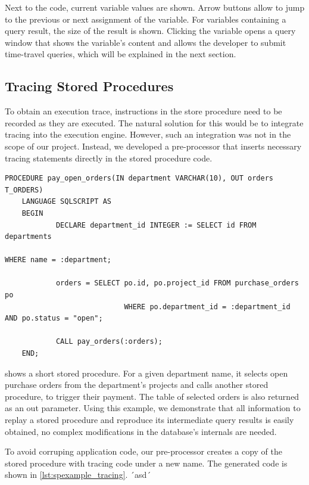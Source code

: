 Next to the code, current variable values are shown.
Arrow buttons allow to jump to the previous or next assignment of the variable.
For variables containing a query result, the size of the result is shown.
Clicking the variable opens a query window that shows the variable's content and allows the developer to submit time-travel queries, which will be explained in the next section.


\subsection{Tracing Stored Procedures}
\label{sec:tracing_stored_procedures}

To obtain an execution trace, instructions in the store procedure need to be recorded as they are executed.
The natural solution for this would be to integrate tracing into the execution engine.
However, such an integration was not in the scope of our project.
Instead, we developed a pre-processor that inserts necessary tracing statements directly in the stored procedure code.

\begin{lstlisting}[language=HanaSQL,float,caption={Stored procedure example with two queries and a procedure call.},label=lst:spexample,firstnumber=1,stepnumber=5]
	PROCEDURE pay_open_orders(IN department VARCHAR(10), OUT orders T_ORDERS)
	LANGUAGE SQLSCRIPT AS
	BEGIN
			DECLARE department_id INTEGER := SELECT id FROM departments 
																			 WHERE name = :department;
			
			orders = SELECT po.id, po.project_id FROM purchase_orders po
							WHERE po.department_id = :department_id AND po.status = "open";

			CALL pay_orders(:orders);
	END;
\end{lstlisting}

 shows a short stored procedure.
For a given department name, it selects open purchase orders from the department's projects and calls another stored procedure, to trigger their payment.
The table of selected orders is also returned as an out parameter.
Using this example, we demonstrate that all information to replay a stored procedure and reproduce its intermediate query results is easily obtained, \ie no complex modifications in the database's internals are needed.

To avoid corruping application code, our pre-processor creates a copy of the stored procedure with tracing code under a new name.
The generated code is shown in \cref{lst:spexample_tracing}.
 ´asd´

